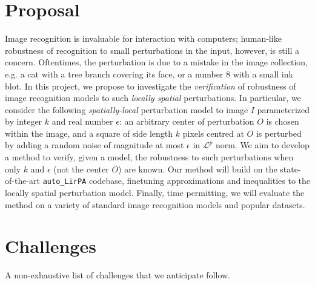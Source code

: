 \documentclass{article}
\begin{document}
\section{Proposal}\label{sec:proposal}

Image recognition is invaluable for interaction with computers; human-like robustness of recognition to small perturbations in the input, however, is still a concern. Oftentimes, the perturbation is due to a mistake in the image collection, e.g. a cat with a tree branch covering its face, or a number 8 with a small ink blot. In this project, we propose to investigate the \emph{verification} of robustness of image recognition models to such \emph{locally spatial} perturbations. In particular, we consider the following \emph{spatially-local} perturbation model to image $I$ parameterized by integer $k$ and real number $\epsilon$: an arbitrary center of perturbation $O$ is chosen within the image, and a square of side length $k$ pixels centred at $O$ is perturbed by adding a random noise of magnitude at most $\epsilon$ in $\mathcal L^p$ norm. We aim to develop a method to verify, given a model, the robustness to such perturbations when only $k$ and $\epsilon$ (not the center $O$) are known. Our method will build on the state-of-the-art \texttt{auto\_LirPA} codebase, finetuning approximations and inequalities to the locally spatial perturbation model. Finally, time permitting, we will evaluate the method on a variety of standard image recognition models and popular datasets.

\section{Challenges}\label{sec:challenges}

A non-exhaustive list of challenges that we anticipate follow.
\end{document}
